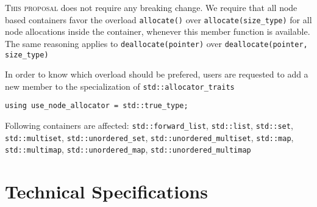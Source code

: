 \documentclass[11pt]{article}
\begin{document}
\textsc{This proposal} does not require any breaking change. We require
that all node based containers favor the overload \texttt{allocate()}
over \texttt{allocate(size\_type)} for all node allocations inside the
container, whenever this member function is available. The same
reasoning applies to \texttt{deallocate(pointer)} over
\texttt{deallocate(pointer, size\_type)}

In order to know which overload should be prefered, users are
requested to add a new member to the specialization of
\texttt{std::allocator\_traits}

\begin{lstlisting}
using use_node_allocator = std::true_type;
\end{lstlisting}

Following containers are affected: \texttt{std::forward\_list},
\texttt{std::list}, \texttt{std::set}, \texttt{std::multiset},
\texttt{std::unordered\_set}, \texttt{std::unordered\_multiset},
\texttt{std::map}, \texttt{std::multimap},
\texttt{std::unordered\_map}, \texttt{std::unordered\_multimap}

\section{Technical Specifications}
\end{document}

